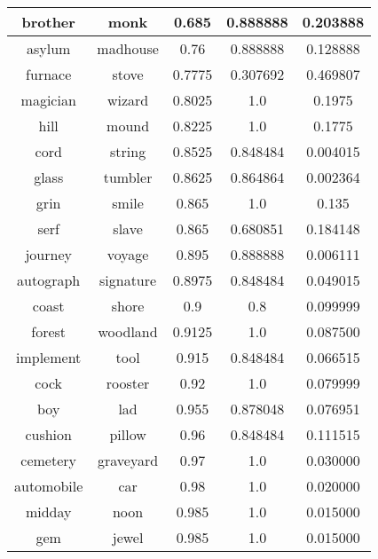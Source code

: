 \begin{table}[p]
\begin{center}
{\begin{tabular}{|c|c|c|c|c|}
\hline
brother & monk & 0.685 & 0.888888 & 0.203888 \\
\hline
asylum & madhouse & 0.76 & 0.888888 & 0.128888 \\
\hline
furnace & stove & 0.7775 & 0.307692 & 0.469807 \\
\hline
magician & wizard & 0.8025 & 1.0 & 0.1975 \\
\hline
hill & mound & 0.8225 & 1.0 & 0.1775 \\
\hline
cord & string & 0.8525 & 0.848484 & 0.004015 \\
\hline
glass & tumbler & 0.8625 & 0.864864 & 0.002364 \\
\hline
grin & smile & 0.865 & 1.0 & 0.135 \\
\hline
serf & slave & 0.865 & 0.680851 & 0.184148 \\
\hline
journey & voyage & 0.895 & 0.888888 & 0.006111 \\
\hline
autograph & signature & 0.8975 & 0.848484 & 0.049015 \\
\hline
coast & shore & 0.9 & 0.8 & 0.099999 \\
\hline
forest & woodland & 0.9125 & 1.0 & 0.087500 \\
\hline
implement & tool & 0.915 & 0.848484 & 0.066515 \\
\hline
cock & rooster & 0.92 & 1.0 & 0.079999 \\
\hline
boy & lad & 0.955 & 0.878048 & 0.076951 \\
\hline
cushion & pillow & 0.96 & 0.848484 & 0.111515 \\
\hline
cemetery & graveyard & 0.97 & 1.0 & 0.030000 \\
\hline
automobile & car & 0.98 & 1.0 & 0.020000 \\
\hline
midday & noon & 0.985 & 1.0 & 0.015000 \\
\hline
gem & jewel & 0.985 & 1.0 & 0.015000 \\
\hline
\end{tabular}
}
\end{center}
\end{table}

